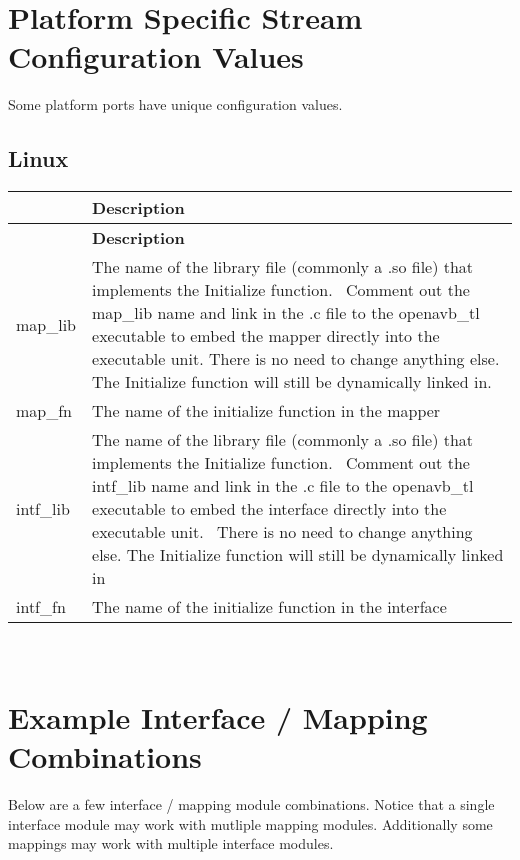 \section*{Platform Specific Stream Configuration Values}

Some platform ports have unique configuration values.

\subsection*{Linux}

\tabulinesep=1mm
\begin{longtabu} spread 0pt [c]{*2{|X[-1]}|}
\hline
{}&{\bf Description  }\\
\endfirsthead
\hline
\endfoot
\hline
{}&{\bf Description  }\\
\endhead
map\+\_\+lib &The name of the library file (commonly a .so file) that implements the Initialize function.~\newline
Comment out the map\+\_\+lib name and link in the .c file to the openavb\+\_\+tl executable to embed the mapper directly into the executable unit. There is no need to change anything else. The Initialize function will still be dynamically linked in. \\
map\+\_\+fn &The name of the initialize function in the mapper \\
intf\+\_\+lib &The name of the library file (commonly a .so file) that implements the Initialize function.~\newline
Comment out the intf\+\_\+lib name and link in the .c file to the openavb\+\_\+tl executable to embed the interface directly into the executable unit.~\newline
There is no need to change anything else. The Initialize function will still be dynamically linked in \\
intf\+\_\+fn &The name of the initialize function in the interface \\
\end{longtabu}
~\newline
\hypertarget{sdk_avtp_stream_cfg_sdk_avtp_stream_cfg_combinations}{}\section{Example Interface / Mapping Combinations }\label{sdk_avtp_stream_cfg_sdk_avtp_stream_cfg_combinations}
Below are a few interface / mapping module combinations. Notice that a single interface module may work with mutliple mapping modules. Additionally some mappings may work with multiple interface modules.

